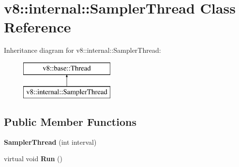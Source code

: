 \hypertarget{classv8_1_1internal_1_1_sampler_thread}{}\section{v8\+:\+:internal\+:\+:Sampler\+Thread Class Reference}
\label{classv8_1_1internal_1_1_sampler_thread}
Inheritance diagram for v8\+:\+:internal\+:\+:Sampler\+Thread\+:\begin{figure}[H]
\begin{center}
\leavevmode
\includegraphics[height=2.000000cm]{classv8_1_1internal_1_1_sampler_thread}
\end{center}
\end{figure}
\subsection*{Public Member Functions}
\begin{DoxyCompactItemize}
\item 
{\bfseries Sampler\+Thread} (int interval)\hypertarget{classv8_1_1internal_1_1_sampler_thread_a3e212b66342406f674dd476df2155c50}{}\label{classv8_1_1internal_1_1_sampler_thread_a3e212b66342406f674dd476df2155c50}

\item 
virtual void {\bfseries Run} ()\hypertarget{classv8_1_1internal_1_1_sampler_thread_ac1d42ef1e1f8ed4be68b4ab08b8236e9}{}\label{classv8_1_1internal_1_1_sampler_thread_ac1d42ef1e1f8ed4be68b4ab08b8236e9}

\end{DoxyCompactItemize}
